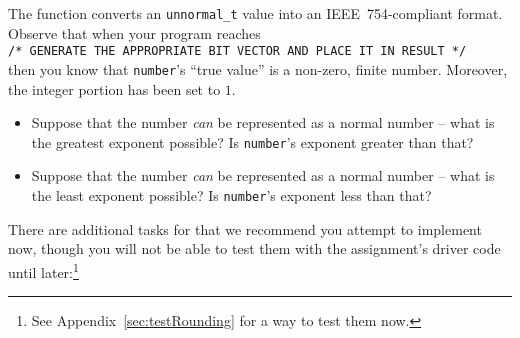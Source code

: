 The  function converts an \lstinline{unnormal_t} value into an IEEE~754-compliant format.
Observe that when your program reaches \\
\lstinline{/* GENERATE THE APPROPRIATE BIT VECTOR AND PLACE IT IN RESULT */} \\
then you know that \lstinline{number}'s ``true value'' is a non-zero, finite number.
Moreover, the integer portion has been set to $1$.

\begin{description}
    \begin{itemize}
        \item Suppose that the number \textit{can} be represented as a normal number -- what is the greatest exponent possible?
        Is \lstinline{number}'s exponent greater than that?
    \end{itemize}
    \begin{itemize}
        \item Suppose that the number \textit{can} be represented as a normal number -- what is the least exponent possible?
        Is \lstinline{number}'s exponent less than that?
    \end{itemize}
\end{description}

There are additional tasks for  that we recommend you attempt to implement now, though you will not be able to test them with the assignment's driver code until later:\footnote{See Appendix~\ref{sec:testRounding} for a way to test them now.}

\begin{description}
\end{description}

